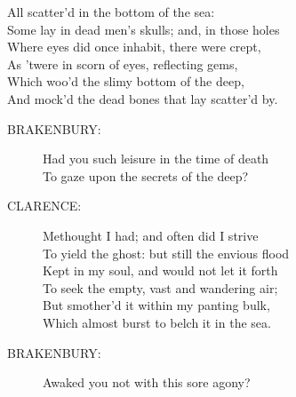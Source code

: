 \documentclass{article}
\begin{document}
\begin{description}
\hspace{1pt}All scatter'd in the bottom of the sea:\\
\hspace{1pt}Some lay in dead men's skulls; and, in those holes\\
\hspace{1pt}Where eyes did once inhabit, there were crept,\\
\hspace{1pt}As 'twere in scorn of eyes, reflecting gems,\\
\hspace{1pt}Which woo'd the slimy bottom of the deep,\\
\hspace{1pt}And mock'd the dead bones that lay scatter'd by.\\
\end{description}
\begin{description}
\item[BRAKENBURY:] 
\hspace{1pt}Had you such leisure in the time of death\\
\hspace{1pt}To gaze upon the secrets of the deep?\\
\end{description}
\begin{description}
\item[CLARENCE:] 
\hspace{1pt}Methought I had; and often did I strive\\
\hspace{1pt}To yield the ghost: but still the envious flood\\
\hspace{1pt}Kept in my soul, and would not let it forth\\
\hspace{1pt}To seek the empty, vast and wandering air;\\
\hspace{1pt}But smother'd it within my panting bulk,\\
\hspace{1pt}Which almost burst to belch it in the sea.\\
\end{description}
\begin{description}
\item[BRAKENBURY:] 
\hspace{1pt}Awaked you not with this sore agony?\\
\end{description}
\end{document}
